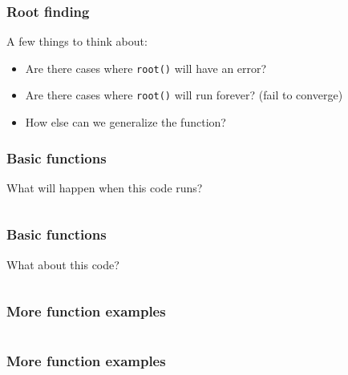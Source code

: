 \documentclass{beamer}
\begin{document}
\begin{frame}
\frametitle{Root finding}
A few things to think about:
\vspace{0.1in}
\begin{itemize}
\setlength{\itemsep}{0.1in}
\item{Are there cases where \texttt{root()} will have an error?}
\item{Are there cases where \texttt{root()} will run forever? (fail to converge)}
\item{How else can we generalize the function?}
\end{itemize}
\end{frame}


\begin{frame}
\frametitle{Basic functions}

What will happen when this code runs?

\begin{center}
\begin{tabular}{c}

\end{tabular}
\end{center}

\end{frame}

\begin{frame}
\frametitle{Basic functions}

What about this code?

\begin{center}
\begin{tabular}{c}

\end{tabular}
\end{center}

\end{frame}


\begin{frame}
\frametitle{More function examples}

\begin{center}
\begin{tabular}{c}

\end{tabular}
\end{center}

\end{frame}

\begin{frame}
\frametitle{More function examples}

\begin{center}
\begin{tabular}{c}

\end{tabular}
\end{center}

\end{frame}
\end{document}
